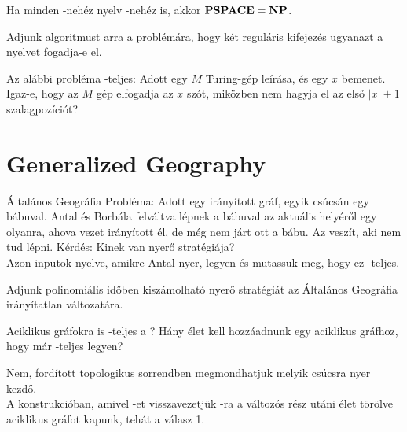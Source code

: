 \begin{Exercise}[counter={sorszam}, difficulty=0]
	Ha minden \NP-nehéz nyelv \PSPACE-nehéz is, akkor $\mbox{\ensuremath{\mathbf{PSPACE}}}=\mbox{\ensuremath{\mathbf{NP}}}$.
\end{Exercise}

\begin{Exercise}[counter={sorszam}, difficulty=0]
	Adjunk \PSPACE algoritmust arra a problémára, hogy két reguláris kifejezés ugyanazt
	a nyelvet fogadja-e el. 
\end{Exercise}


\begin{Exercise}[counter={sorszam}, difficulty=0]
	Az alábbi probléma \PSPACE-teljes: Adott egy $M$ Turing-gép leírása, és egy $x$ bemenet. Igaz-e, hogy az $M$ gép elfogadja az $x$ szót, miközben nem hagyja el az első $|x|+1$ szalagpozíciót?
	
\end{Exercise}


\section{Generalized Geography}

\begin{Exercise}[counter={sorszam}, difficulty=0]
	Általános Geográfia Probléma:	
	Adott egy irányított gráf, egyik csúcsán egy bábuval. Antal és Borbála
	felváltva lépnek a bábuval az aktuális helyéről egy olyanra, ahova vezet
	irányított él, de még nem járt ott a bábu. Az veszít, aki nem tud lépni.
	Kérdés: Kinek van nyerő stratégiája?\\
	Azon inputok nyelve, amikre Antal nyer, legyen	
	 \'es mutassuk meg, hogy ez \PSPACE-teljes.	
\end{Exercise}


\begin{Exercise}[counter={sorszam}, difficulty=2]
	Adjunk polinomiális időben kiszámolható nyerő stratégiát az Általános Geográfia
	irányítatlan változatára.
	
\end{Exercise}

\begin{Exercise}[counter={sorszam}, difficulty=0]
	Aciklikus gr\'afokra is \PSPACE -teljes a ? H\'any \'elet kell hozz\'aadnunk egy aciklikus gr\'afhoz, hogy m\'ar \PSPACE -teljes legyen?
\end{Exercise}	
\begin{Answer}
	Nem, ford\'itott topologikus sorrendben megmondhatjuk melyik cs\'ucsra nyer kezd\H o.\\
	A konstrukci\'oban, amivel -et visszavezetj\"uk -ra a v\'altoz\'os r\'esz ut\'ani \'elet t\"or\"olve aciklikus gr\'afot kapunk, teh\'at a v\'alasz 1.
\end{Answer} 

